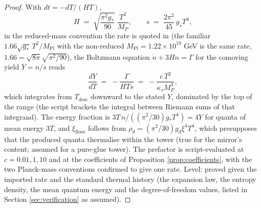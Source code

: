 \documentclass[11pt]{article}
\theoremstyle{definition}
\begin{document}
\begin{proof}
With $dt = -dT/(HT)$,
\[
H \;=\; \sqrt{\frac{\pi^{2}g_{*}}{90}}\;\frac{T^{2}}{M_{P}}, \qquad s \;=\; \frac{2\pi^{2}}{45}\,g_{s}T^{3},
\]
in the reduced-mass convention the rate is quoted in (the familiar $1.66\sqrt{g_{*}}\,T^{2}/M_{\mathrm{Pl}}$ with the non-reduced $M_{\mathrm{Pl}} = 1.22 \times 10^{19}$ GeV is the same rate, $1.66 = \sqrt{8\pi}\sqrt{\pi^{2}/90}$), the Boltzmann equation $\dot{n} + 3Hn = \Gamma$ for the comoving yield $Y = n/s$ reads
\[
\frac{dY}{dT} \;=\; -\frac{\Gamma}{HTs} \;=\; -\frac{c\,T^{2}}{\kappa_{s}M_{P}^{3}},
\]
which integrates from $T_{\mathrm{desc}}$ downward to the stated $Y$, dominated by the top of the range (the script brackets the integral between Riemann sums of that integrand). The energy fraction is $3T\,n/((\pi^{2}/30)g_{*}T^{4}) = 4Y$ for quanta of mean energy $3T$, and $\xi_{\mathrm{floor}}$ follows from $\rho_{d} = (\pi^{2}/30)g_{d}\xi^{4}T^{4}$, which presupposes that the produced quanta thermalise within the tower (true for the mirror's content; assumed for a pure-glue tower). The prefactor is script-evaluated at $c = 0.01, 1, 10$ and at the coefficients of Proposition \ref{prop:coefficients}, with the two Planck-mass conventions confirmed to give one rate. Level: proved given the imported rate and the standard thermal history (the expansion law, the entropy density, the mean quantum energy and the degree-of-freedom values, listed in Section \ref{sec:verification} as assumed).
\end{proof}
\end{document}
